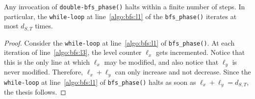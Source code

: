 \begin{lemma}\label{lemma:halt_double-bfs}
Any invocation of \texttt{double-bfs\_phase()} halts within a finite number of steps.
In particular, the \texttt{while-loop} at line~\ref{algo:bfs:l1}
of the \texttt{bfs\_phase()} iterates at most $d_{S,T}$ times.
\end{lemma}
\begin{proof}
Consider the \texttt{while-loop} at line~\ref{algo:bfs:l1} of \texttt{bfs\_phase()}.
At each iteration of line~\ref{algo:bfs:l3}, the level counter $\ell_x$ gets incremented.
Notice that this is the only line at which $\ell_x$ may be modified,
and also notice that $\ell_y$ is never modified. Therefore, $\ell_x+\ell_y$ can only increase and not decrease.
Since the \texttt{while-loop} at line~\ref{algo:bfs:l1} of \texttt{bfs\_phase()} halts as soon as $\ell_x+\ell_y=d_{S,T}$,
the thesis follows.
\end{proof}

